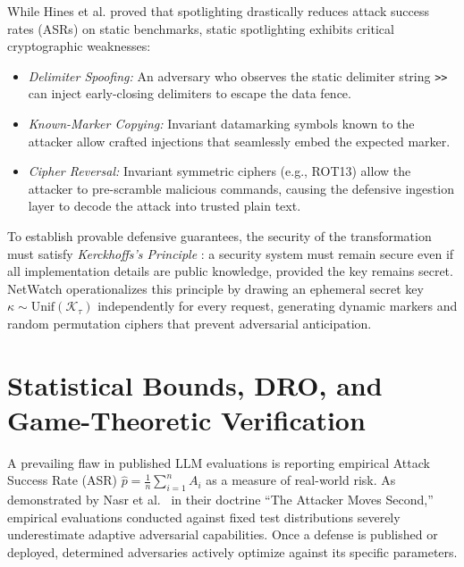 While Hines et al. proved that spotlighting drastically reduces attack success rates (ASRs) on static benchmarks, static spotlighting exhibits critical cryptographic weaknesses:
\begin{itemize}
    \item \emph{Delimiter Spoofing:} An adversary who observes the static delimiter string \texttt{>>} can inject early-closing delimiters to escape the data fence.
    \item \emph{Known-Marker Copying:} Invariant datamarking symbols known to the attacker allow crafted injections that seamlessly embed the expected marker.
    \item \emph{Cipher Reversal:} Invariant symmetric ciphers (e.g., ROT13) allow the attacker to pre-scramble malicious commands, causing the defensive ingestion layer to decode the attack into trusted plain text.
\end{itemize}

To establish provable defensive guarantees, the security of the transformation must satisfy \emph{Kerckhoffs's Principle} \cite{kerckhoffs1883}: a security system must remain secure even if all implementation details are public knowledge, provided the key remains secret. NetWatch operationalizes this principle by drawing an ephemeral secret key $\kappa \sim \mathrm{Unif}(\mathcal{K}_\tau)$ independently for every request, generating dynamic markers and random permutation ciphers that prevent adversarial anticipation.

\section{Statistical Bounds, DRO, and Game-Theoretic Verification}
\label{sec:rel_statistical_verification}

A prevailing flaw in published LLM evaluations is reporting empirical Attack Success Rate (ASR) $\hat{p} = \frac{1}{n}\sum_{i=1}^n A_i$ as a measure of real-world risk. As demonstrated by Nasr et al.~\cite{nasr2025attacker} in their doctrine ``The Attacker Moves Second,'' empirical evaluations conducted against fixed test distributions severely underestimate adaptive adversarial capabilities. Once a defense is published or deployed, determined adversaries actively optimize against its specific parameters.

